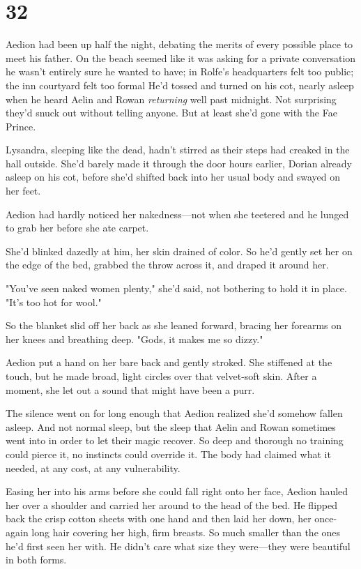 
\chapter{32}

Aedion had been up half the night, debating the merits of every possible place to meet his father. On the beach seemed like it was asking for a private conversation he wasn't entirely sure he wanted to have; in Rolfe's headquarters felt too public; the inn courtyard felt too formal
 He'd tossed and turned on his cot, nearly asleep when he heard Aelin and Rowan \emph{returning} well past midnight. Not surprising they'd snuck out without telling anyone. But at least she'd gone with the Fae Prince.

Lysandra, sleeping like the dead, hadn't stirred as their steps had creaked in the hall outside. She'd barely made it through the door hours earlier, Dorian already asleep on his cot, before she'd shifted back into her usual body and swayed on her feet.

Aedion had hardly noticed her nakedness---not when she teetered and he lunged to grab her before she ate carpet.

She'd blinked dazedly at him, her skin drained of color. So he'd gently set her on the edge of the bed, grabbed the throw across it, and draped it around her.

"You've seen naked women plenty," she'd said, not bothering to hold it in place. "It's too hot for wool."

So the blanket slid off her back as she leaned forward, bracing her forearms on her knees and breathing deep. "Gods, it makes me so dizzy."

Aedion put a hand on her bare back and gently stroked. She stiffened at the touch, but he made broad, light circles over that velvet-soft skin. After a moment, she let out a sound that might have been a purr.

The silence went on for long enough that Aedion realized she'd somehow fallen asleep. And not normal sleep, but the sleep that Aelin and Rowan sometimes went into in order to let their magic recover. So deep and thorough no training could pierce it, no instincts could override it. The body had claimed what it needed, at any cost, at any vulnerability.

Easing her into his arms before she could fall right onto her face, Aedion hauled her over a shoulder and carried her around to the head of the bed. He flipped back the crisp cotton sheets with one hand and then laid her down, her once-again long hair covering her high, firm breasts. So much smaller than the ones he'd first seen her with. He didn't care what size they were---they were beautiful in both forms.

